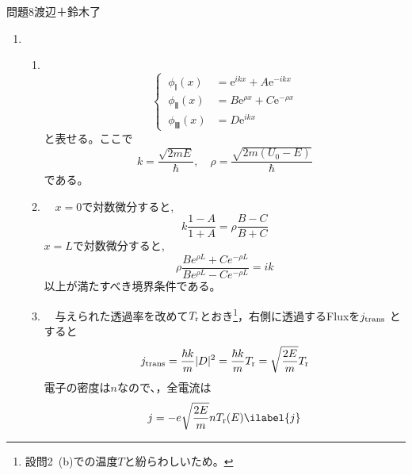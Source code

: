 \documentclass[fleqn]{jbook}
\begin{document}

\begin{answer}{問題8}{渡辺＋鈴木了}
\setcounter{equation}{0}


\begin{enumerate}

  \item 　
  
  \begin{enumerate}
  
    \item 　
\begin{equation}
\begin{cases}
       ~\phi_Ⅰ(x) & = \mathrm{e}^{i kx} + A \mathrm{e}^{-i kx} \\
       ~\phi_Ⅱ(x) & = B \mathrm{e}^{\rho x} + C \mathrm{e}^{ - \rho x} \\
       ~\phi_Ⅲ(x) & = D \mathrm{e}^{i kx} 
\end{cases}
\end{equation}
と表せる。ここで
\begin{equation}
k = \frac{\sqrt {2mE}}{\hbar} , \quad \rho = \frac{\sqrt {2m(U_0-E)}}{\hbar}\nonumber
\end{equation}
である。\\
    
    \item 　$x=0$で対数微分すると,
\begin{equation}
k\frac{1-A}{1+A} = \rho\frac{B-C}{B+C}
\end{equation}
$x=L$で対数微分すると,
\begin{equation}
\rho\frac{Be^{\rho L}+Ce^{-\rho L}}{Be^{\rho L}-Ce^{-\rho L}} = i k
\end{equation}
以上が満たすべき境界条件である。\\

    \item 　与えられた透過率を改めて$T_{\rm r}$とおき\footnote{設問2~(b)での温度$T$と紛らわしいため。}，右側に透過するFluxを$j_{\rm trans}$ とすると
\begin{equation*}
j_{\rm trans} = \frac{\hbar k}{m}|D|^2 = \frac{\hbar k}{m}T_{\rm r} = \sqrt{\frac{2E}{m}}T_{\rm r}
\end{equation*}
電子の密度は$n$なので、，全電流は
\begin{equation}
j = - e \sqrt{\frac{2E}{m}}nT_{\rm r}(E) \ilabel{j}
\end{equation}
    

\end{enumerate}
\end{enumerate}
\end{answer}
\end{document}
